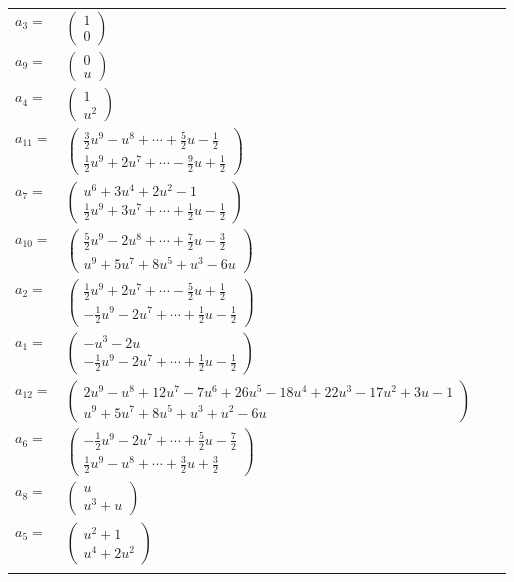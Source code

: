 \documentclass[1p]{elsarticle_modified}
\theoremstyle{definition}
\begin{document}
\begin{tabular}{m{7pt} m{180pt} m{7pt} m{180pt} }
\flushright $a_{3}=$&$\begin{pmatrix}1\\0\end{pmatrix}$ \\
\flushright $a_{9}=$&$\begin{pmatrix}0\\u\end{pmatrix}$ \\
\flushright $a_{4}=$&$\begin{pmatrix}1\\u^2\end{pmatrix}$ \\
\flushright $a_{11}=$&$\begin{pmatrix}\frac{3}{2} u^9- u^8+\cdots+\frac{5}{2} u-\frac{1}{2}\\\frac{1}{2} u^9+2 u^7+\cdots-\frac{9}{2} u+\frac{1}{2}\end{pmatrix}$ \\
\flushright $a_{7}=$&$\begin{pmatrix}u^6+3 u^4+2 u^2-1\\\frac{1}{2} u^9+3 u^7+\cdots+\frac{1}{2} u-\frac{1}{2}\end{pmatrix}$ \\
\flushright $a_{10}=$&$\begin{pmatrix}\frac{5}{2} u^9-2 u^8+\cdots+\frac{7}{2} u-\frac{3}{2}\\u^9+5 u^7+8 u^5+u^3-6 u\end{pmatrix}$ \\
\flushright $a_{2}=$&$\begin{pmatrix}\frac{1}{2} u^9+2 u^7+\cdots-\frac{5}{2} u+\frac{1}{2}\\-\frac{1}{2} u^9-2 u^7+\cdots+\frac{1}{2} u-\frac{1}{2}\end{pmatrix}$ \\
\flushright $a_{1}=$&$\begin{pmatrix}- u^3-2 u\\-\frac{1}{2} u^9-2 u^7+\cdots+\frac{1}{2} u-\frac{1}{2}\end{pmatrix}$ \\
\flushright $a_{12}=$&$\begin{pmatrix}2 u^9- u^8+12 u^7-7 u^6+26 u^5-18 u^4+22 u^3-17 u^2+3 u-1\\u^9+5 u^7+8 u^5+u^3+u^2-6 u\end{pmatrix}$ \\
\flushright $a_{6}=$&$\begin{pmatrix}-\frac{1}{2} u^9-2 u^7+\cdots+\frac{5}{2} u-\frac{7}{2}\\\frac{1}{2} u^9- u^8+\cdots+\frac{3}{2} u+\frac{3}{2}\end{pmatrix}$ \\
\flushright $a_{8}=$&$\begin{pmatrix}u\\u^3+u\end{pmatrix}$ \\
\flushright $a_{5}=$&$\begin{pmatrix}u^2+1\\u^4+2 u^2\end{pmatrix}$\\&\end{tabular}
\end{document}
